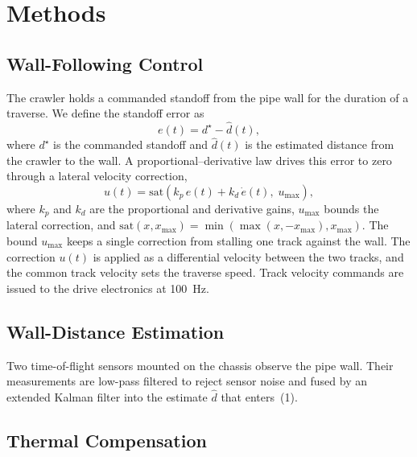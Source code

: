 \section{Methods}

\subsection{Wall-Following Control}

The crawler holds a commanded standoff from the pipe wall for the duration of a
traverse. We define the standoff error as
%
\begin{equation}
e(t) = d^{\star} - \hat{d}(t),
\end{equation}
%
where $d^{\star}$ is the commanded standoff and $\hat{d}(t)$ is the estimated distance
from the crawler to the wall. A proportional--derivative law drives this error to zero
through a lateral velocity correction,
%
\begin{equation}
u(t) = \mathrm{sat}\!\left(k_{p}\,e(t) + k_{d}\,\dot{e}(t),\; u_{\max}\right),
\end{equation}
%
where $k_{p}$ and $k_{d}$ are the proportional and derivative gains, $u_{\max}$ bounds
the lateral correction, and
$\mathrm{sat}(x, x_{\max}) = \min(\max(x, -x_{\max}), x_{\max})$. The bound $u_{\max}$
keeps a single correction from stalling one track against the wall. The correction
$u(t)$ is applied as a differential velocity between the two tracks, and the common
track velocity sets the traverse speed. Track velocity commands are issued to the drive
electronics at 100~Hz.

\subsection{Wall-Distance Estimation}

Two time-of-flight sensors mounted on the chassis observe the pipe wall. Their
measurements are low-pass filtered to reject sensor noise and fused by an extended
Kalman filter into the estimate $\hat{d}$ that enters~(1).

\subsection{Thermal Compensation}

